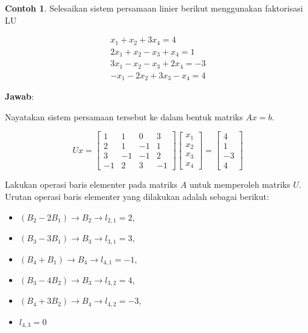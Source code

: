 \documentclass[
]{book}
\providecommand{\tightlist}{%
  \setlength{\itemsep}{0pt}\setlength{\parskip}{0pt}}
\theoremstyle{definition}
\theoremstyle{definition}
\newtheorem{example}{Contoh}[chapter]
\theoremstyle{definition}
\theoremstyle{definition}
\theoremstyle{remark}
\begin{document}
\begin{example}
\protect\hypertarget{exm:LUexmp}{}\label{exm:LUexmp}Selesaikan sistem persamaan linier berikut menggunakan faktorisasi LU
\end{example}

\[
\begin{matrix}
  x_1+x_2+3x_4=4 \\
  2x_1+x_2-x_3+x_4=1 \\
  3x_1-x_2-x_3+2x_4=-3 \\
  -x_1-2x_2+3x_3-x_4=4
\end{matrix}
\]

\textbf{Jawab}:

Nayatakan sistem persamaan tersebut ke dalam bentuk matriks \(Ax=b\).

\begin{equation*}
Ux=
\begin{bmatrix}
     1       & 1       & 0       & 3           \\[0.3em]
     2       & 1       & -1      & 1           \\[0.3em]
     3       & -1      & -1      & 2           \\[0.3em]
     -1      & 2       & 3       & -1           
     \end{bmatrix}
\begin{bmatrix}
     x_1                                          \\[0.3em]
     x_2                                          \\[0.3em]
     x_3                                          \\[0.3em]
     x_4                                       
     \end{bmatrix}
= \begin{bmatrix}
     4                                          \\[0.3em]
     1                                          \\[0.3em]
     -3                                          \\[0.3em]
     4                                       
     \end{bmatrix}
\end{equation*}

Lakukan operasi baris elementer pada matriks \(A\) untuk memperoleh matriks \(U\). Urutan operasi baris elementer yang dilakukan adalah sebagai berikut:

\begin{itemize}
\tightlist
\item
  \(\left(B_2-2B_1\right)\to B_2 \to l_{2,1}=2\),
\item
  \(\left(B_3-3B_1\right)\to B_3 \to l_{3,1}=3\),
\item
  \(\left(B_4+B_1\right)\to B_4 \to l_{4,1}=-1\),
\item
  \(\left(B_3-4B_2\right)\to B_3\to l_{3,2}=4\),
\item
  \(\left(B_4+3B_2\right)\to B_4 \to l_{4,2}=-3\),
\item
  \(l_{4,3}=0\)
\end{itemize}
\end{document}
